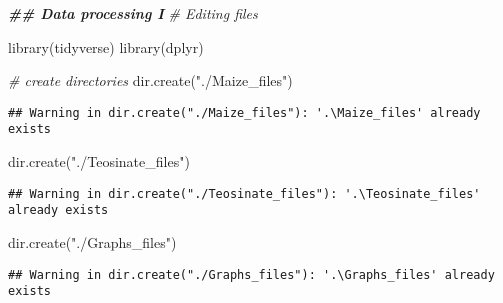 \documentclass[
]{article}
\newenvironment{Shaded}{\begin{snugshade}}{\end{snugshade}}
\newcommand{\CommentTok}[1]{\textcolor[rgb]{0.56,0.35,0.01}{\textit{#1}}}
\newcommand{\DocumentationTok}[1]{\textcolor[rgb]{0.56,0.35,0.01}{\textbf{\textit{#1}}}}
\newcommand{\FunctionTok}[1]{\textcolor[rgb]{0.00,0.00,0.00}{#1}}
\newcommand{\NormalTok}[1]{#1}
\newcommand{\StringTok}[1]{\textcolor[rgb]{0.31,0.60,0.02}{#1}}
\begin{document}
\begin{Shaded}
\begin{Highlighting}[]
\DocumentationTok{\#\# Data processing I}
\CommentTok{\# Editing files }

\FunctionTok{library}\NormalTok{(tidyverse)}
\FunctionTok{library}\NormalTok{(dplyr)}

\CommentTok{\# create directories}
\FunctionTok{dir.create}\NormalTok{(}\StringTok{"./Maize\_files"}\NormalTok{)}
\end{Highlighting}
\end{Shaded}

\begin{verbatim}
## Warning in dir.create("./Maize_files"): '.\Maize_files' already exists
\end{verbatim}

\begin{Shaded}
\begin{Highlighting}[]
\FunctionTok{dir.create}\NormalTok{(}\StringTok{"./Teosinate\_files"}\NormalTok{)}
\end{Highlighting}
\end{Shaded}

\begin{verbatim}
## Warning in dir.create("./Teosinate_files"): '.\Teosinate_files' already exists
\end{verbatim}

\begin{Shaded}
\begin{Highlighting}[]
\FunctionTok{dir.create}\NormalTok{(}\StringTok{"./Graphs\_files"}\NormalTok{)}
\end{Highlighting}
\end{Shaded}

\begin{verbatim}
## Warning in dir.create("./Graphs_files"): '.\Graphs_files' already exists
\end{verbatim}
\end{document}
